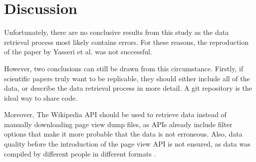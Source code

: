 \chapter{Discussion}
\label{sec:discussion}
Unfortunately, there are no conclusive results from this study as the data retrieval process most likely contains errors. For these reasons, the reproduction of the paper by Yasseri et al. was not successful. 

However, two conclusions can still be drawn from this circumstance. Firstly, if scientific papers truly want to be replicable, they should either include all of the data, or describe the data retrieval process in more detail. A git repository is the ideal way to share code. 

Moreover, The Wikipedia API should be used to retrieve data instead of manually downloading page view dump files, as APIs already include filter options that make it more probable that the data is not erroneous. Also, data quality before the introduction of the page view API is not ensured, as data was compiled by different people in different formats \cite{WikiDumps2023}.

